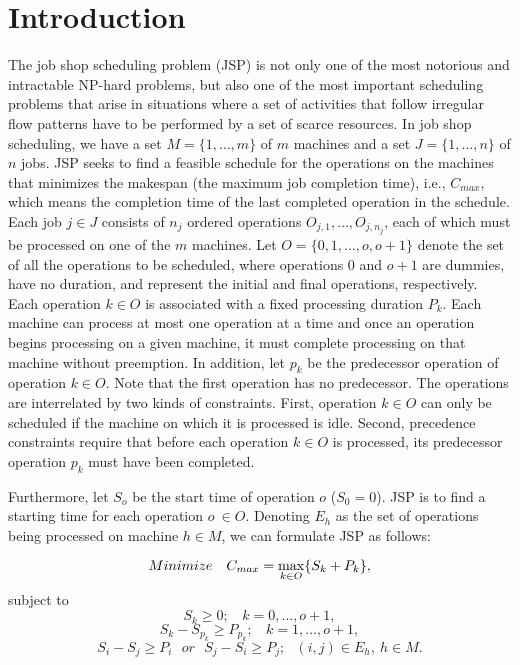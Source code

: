 \documentclass[authoryear,12pt]{elsarticle}
\begin{document}
\section{Introduction}
\label{Sec_Intro}
The job shop scheduling problem (JSP) is not only one of the most notorious and intractable NP-hard problems, but also one of the most important scheduling problems that arise in situations where a set of activities that follow irregular flow patterns have to be performed by a set of scarce resources. In job shop scheduling, we have a set $M = \{1,\ldots,m\}$ of $m$ machines and a set $J = \{1,\ldots,n\}$ of $n$ jobs. JSP seeks to find a feasible schedule for the operations on the machines that minimizes the makespan (the maximum job completion time), i.e., $C_{max}$, which means the completion time of the last completed operation in the schedule. Each job $j \in J$ consists of $n_{j}$ ordered operations $O_{j,1},\ldots,O_{j,n_{j}}$, each of which must be processed on one of the $m$ machines. Let $O = \{0,1,\ldots,o,o+1\}$ denote the set of all the operations to be scheduled, where operations $0$ and $o + 1$ are dummies, have no duration, and represent the initial and final operations, respectively. Each operation $k\in O$ is associated with a fixed processing duration $P_{k}$. Each machine can process at most one operation at a time and once an operation begins processing on a given machine, it must complete processing on that machine without preemption. In addition, let $p_{k}$ be the predecessor operation of operation $k \in O$. Note that the first operation has no predecessor. The operations are interrelated by two kinds of constraints. First, operation $k \in O$ can only be scheduled if the machine on which it is processed is idle. Second, precedence constraints require that before each operation $k \in O$ is processed, its predecessor operation $p_{k}$ must have been completed.

Furthermore, let $S_{o}$ be the start time of operation $o$ ($S_{0} = 0$). JSP is to find a starting time for each operation $o\ \in O $. Denoting $E_{h}$ as the set of operations being processed on machine $h \in M$, we can formulate JSP as follows:

\begin{equation}
\label{Define_Cmax}
\centering{Minimize\ \ \ C_{max}= \max\limits_{k\in O}}\{S_{k}+P_{k}\},
\end{equation}
subject to
\begin{equation}
\label{Define_Si}
S_{k} \geq 0;\ \ \ \ k= 0,\ldots,o+1,
\end{equation}
\begin{equation}
\label{Define_Si2}
S_{k} - S_{p_{k}} \geq P_{p_{k}};\ \ \ \ k= 1,\ldots,o+1,
\end{equation}
\begin{equation}
\label{Define_Si3}
S_{i}-S_{j} \geq P_{i}\ \ \ or\ \ \ S_{j}- S_{i} \geq P_{j};\ \ \ (i,j) \in E_{h},\ h\in M.
\end{equation}
\end{document}
